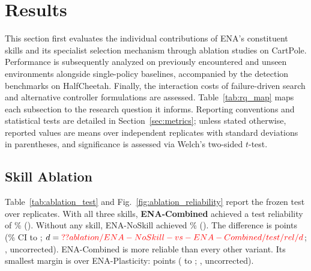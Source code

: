 \section{Results}
\label{sec:results}

This section first evaluates the individual contributions of ENA's constituent skills and its specialist selection mechanism through ablation studies on CartPole. Performance is subsequently analyzed on previously encountered and unseen environments alongside single-policy baselines, accompanied by the detection benchmarks on HalfCheetah. Finally, the interaction costs of failure-driven search and alternative controller formulations are assessed. Table~\ref{tab:rq_map} maps each subsection to the research question it informs. Reporting conventions and statistical tests are detailed in Section~\ref{sec:metrics}; unless stated otherwise, reported values are means over independent replicates with standard deviations in parentheses, and significance is assessed via Welch's two-sided $t$-test.

\subsection{Skill Ablation}
\label{sec:ablation}
Table~\ref{tab:ablation_test} and Fig.~\ref{fig:ablation_reliability} report the frozen test over  replicates. With all three skills, \textbf{ENA-Combined} achieved a test reliability of \% (). Without any skill, ENA-NoSkill achieved \% (). The difference is  points (\% CI  to ; $d = \Res{ablation/ENA-NoSkill-vs-ENA-Combined/test/rel/d}$; , uncorrected). ENA-Combined is more reliable than every other variant. Its smallest margin is over ENA-Plasticity:  points ( to ; , uncorrected).

